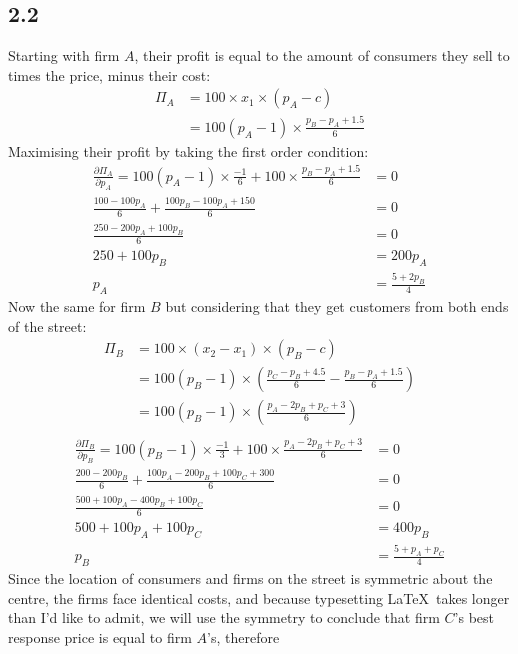 \documentclass{article}
\begin{document}
\subsection*{2.2}
Starting with firm $A$, their profit is equal to the amount of consumers they sell to times the price, minus their cost:
\begin{align*}
    \Pi_{A} &= 100 \times x_{1} \times (p_{A} - c)\\
    &= 100(p_{A} - 1) \times \frac{p_{B} - p_{A} + 1.5}{6}
\end{align*}
Maximising their profit by taking the first order condition:
\begin{align*}
    \frac{\partial \Pi_{A}}{\partial p_{A}} = 100(p_{A} - 1) \times \frac{-1}{6} + 100 \times \frac{p_{B} - p_{A} + 1.5}{6} &= 0\\
    \frac{100 - 100p_{A}}{6} + \frac{100p_{B} - 100p_{A} + 150}{6} &= 0\\
    \frac{250 - 200p_{A} + 100p_{B}}{6} &= 0\\
    250 + 100p_{B} &= 200p_{A}\\
    p_{A} &= \frac{5 + 2p_{B}}{4}
\end{align*}
Now the same for firm $B$ but considering that they get customers from both ends of the street:
\begin{align*}
    \Pi_{B}&= 100 \times (x_{2} - x_{1}) \times (p_{B} - c)                                                      \\
           &= 100(p_{B} - 1) \times \left( \frac{p_{C} - p_{B} + 4.5}{6} - \frac{p_{B} - p_{A} + 1.5}{6} \right) \\
           &= 100(p_{B} - 1) \times \left( \frac{p_{A} - 2p_{B} + p_{C} + 3}{6} \right)                          \\
\end{align*}
\begin{align*}
    \frac{\partial \Pi_{B}}{\partial p_{B}} = 100(p_{B} - 1) \times \frac{-1}{3} + 100 \times \frac{p_{A} - 2p_{B} + p_{C} + 3}{6} & = 0\\
    \frac{200 - 200p_{B}}{6} + \frac{100p_{A} - 200p_{B} + 100p_{C} + 300}{6} & = 0\\
    \frac{500 + 100p_{A} - 400p_{B} + 100p_{C}}{6} & = 0\\
    500 + 100p_{A} + 100p_{C} &= 400p_{B}\\
    p_{B} &= \frac{5 + p_{A} + p_{C}}{4}
\end{align*}
Since the location of consumers and firms on the street is symmetric about the centre, the firms face identical costs, and because typesetting \LaTeX\ takes longer than I'd like to admit, we will use the symmetry to conclude that firm $C$'s best response price is equal to firm $A$'s, therefore
\end{document}
